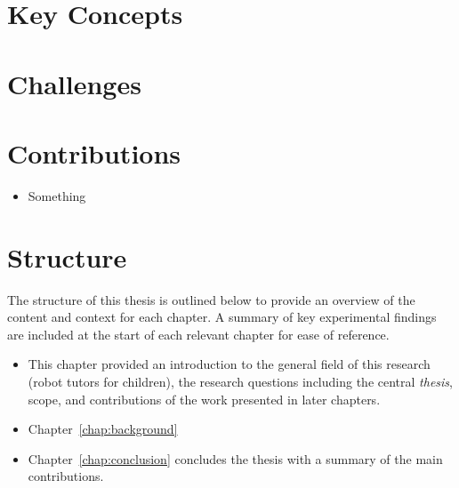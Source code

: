 \section{Key Concepts}\label{sec:intro-concepts}

\section{Challenges}

\section{Contributions}\label{sec:intro-contr}

\begin{itemize}
	\item Something 
\end{itemize}

\section{Structure}\label{sec:intro-struct}
The structure of this thesis is outlined below to provide an overview of the content and context for each chapter. A summary of key experimental findings are included at the start of each relevant chapter for ease of reference.

\begin{itemize}
\item This chapter provided an introduction to the general field of this research (robot tutors for children), the research questions including the central \textit{thesis}, scope, and contributions of the work presented in later chapters.

\item Chapter~\ref{chap:background} 



\item Chapter~\ref{chap:conclusion} concludes the thesis with a summary of the main contributions.

\end{itemize}
